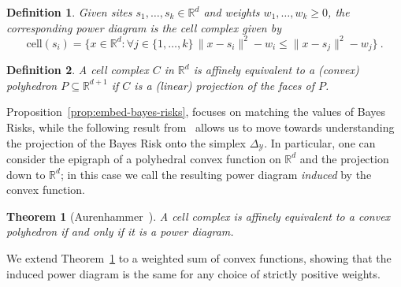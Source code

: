 \documentclass[11pt]{article}
\newcommand{\Comments}{1}
\newcommand{\mynote}[2]{\ifnum\Comments=1\textcolor{#1}{#2}\fi}
\newcommand{\raf}[1]{\mynote{darkgreen}{[RF: #1]}}
\newcommand{\reals}{\mathbb{R}}
\newcommand{\cell}{\mathrm{cell}}
\newcommand{\simplex}{\Delta_\Y}
\newcommand{\Y}{\mathcal{Y}}
\newtheorem{theorem}{Theorem}
\newtheorem{definition}{Definition}
\begin{document}
\begin{definition}\label{def:power-diagram}
  Given sites $s_1,\ldots,s_k\in\reals^d$ and weights $w_1,\ldots,w_k \geq 0$, the corresponding \emph{power diagram} is the cell complex given by
  \begin{equation}
    \label{eq:pd}
    \cell(s_i) = \{ x \in\reals^d : \forall j \in \{1,\ldots,k\} \, \|x - s_i\|^2 - w_i \leq \|x - s_j\|^2 - w_j\}~.
  \end{equation}
\end{definition}

\begin{definition}\label{def:affine-equiv}
  A cell complex $C$ in $\reals^d$ is \emph{affinely equivalent} to a (convex) polyhedron $P \subseteq \reals^{d+1}$ if $C$ is a (linear) projection of the faces of $P$.
\end{definition}

Proposition~\ref{prop:embed-bayes-risks}, focuses on matching the values of Bayes Risks, while the following result from~\citet{aurenhammer1987power} allows us to move towards understanding the projection of the Bayes Risk onto the simplex $\simplex$.
In particular, one can consider the epigraph of a polyhedral convex function on $\reals^d$ and the projection down to $\reals^d$; in this case we call the resulting power diagram \emph{induced} by the convex function.

\begin{theorem}[Aurenhammer~\cite{aurenhammer1987power}]\label{thm:aurenhammer}
	A cell complex is affinely equivalent to a convex polyhedron if and only if it is a power diagram.
\end{theorem}

We extend Theorem~\ref{thm:aurenhammer} to a weighted sum of convex functions, showing that the induced power diagram is the same for any choice of strictly positive weights.
\end{document}
